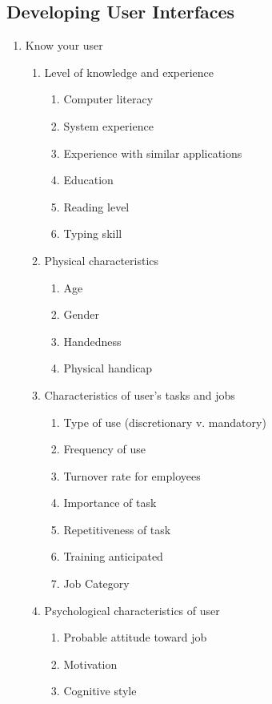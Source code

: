 \documentclass{report}
\begin{document}
			\subsection{Developing User Interfaces}
				\begin{enumerate}
					\item Know your user
						\begin{enumerate}
							\item Level of knowledge and experience
								\begin{enumerate}
									\item Computer literacy
									\item System experience
									\item Experience with similar applications
									\item Education
									\item Reading level
									\item Typing skill
								\end{enumerate}
							\item Physical characteristics
								\begin{enumerate}
									\item Age
									\item Gender
									\item Handedness
									\item Physical handicap
								\end{enumerate}
							\item Characteristics of user's tasks and jobs
								\begin{enumerate}
									\item Type of use (discretionary v. mandatory)
									\item Frequency of use
									\item Turnover rate for employees
									\item Importance of task
									\item Repetitiveness of task
									\item Training anticipated
									\item Job Category
								\end{enumerate}
							\item Psychological characteristics of user
								\begin{enumerate}
									\item Probable attitude toward job
									\item Motivation
									\item Cognitive style

\end{enumerate}
\end{enumerate}
\end{enumerate}
\end{document}
